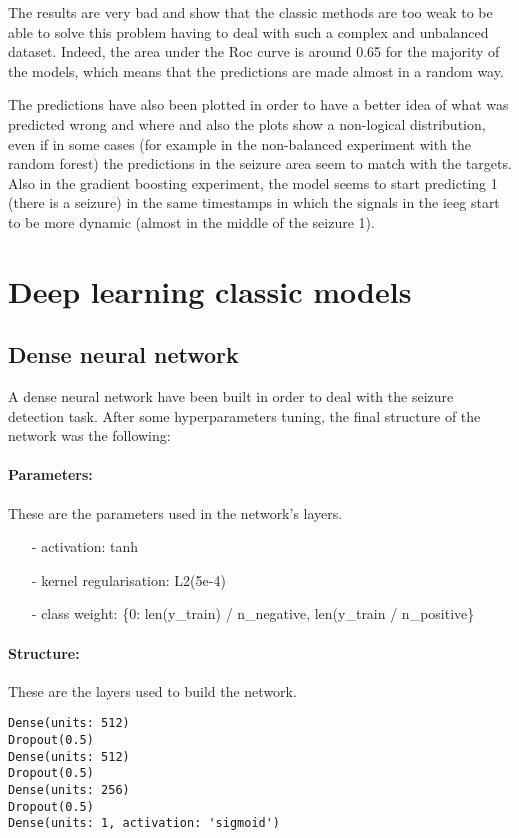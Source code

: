 The results are very bad and show that the classic methods are too weak to be able to solve this problem having to deal with such a complex and unbalanced dataset. Indeed, the area under the Roc curve is around 0.65 for the majority of the models, which means that the predictions are made almost in a random way.

The predictions have also been plotted in order to have a better idea of what was predicted wrong and where and also the plots show a non-logical distribution, even if in some cases (for example in the non-balanced experiment with the random forest) the predictions in the seizure area seem to match with the targets. Also in the gradient boosting experiment, the model seems to start predicting 1 (there is a seizure) in the same timestamps in which the signals in the ieeg start to be more dynamic (almost in the middle of the seizure 1).


\section{Deep learning classic models}

\subsection{Dense neural network}

A dense neural network have been built in order to deal with the seizure detection task. After some hyperparameters tuning, the final structure of the network was the following:

\paragraph{Parameters:} These are the parameters used in the network's layers.
\begin{itemize}
    \item[-] activation: tanh
    \item[-] kernel regularisation: L2(5e-4)
    \item[-] class weight: \{0: len(y\_train) / n\_negative, len(y\_train / n\_positive\}
\end{itemize}

\paragraph{Structure:} These are the layers used to build the network.
\begin{lstlisting}
Dense(units: 512)
Dropout(0.5)
Dense(units: 512)
Dropout(0.5)
Dense(units: 256)
Dropout(0.5)
Dense(units: 1, activation: 'sigmoid')
\end{lstlisting}

